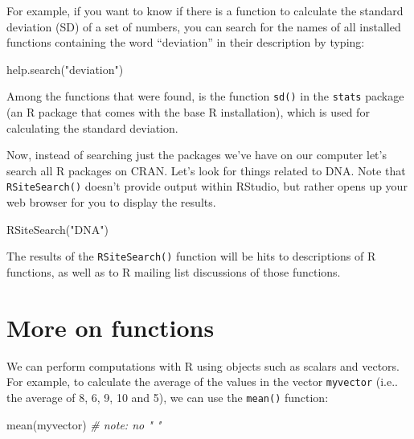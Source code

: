 \documentclass[
]{book}
\newenvironment{Shaded}{\begin{snugshade}}{\end{snugshade}}
\newcommand{\CommentTok}[1]{\textcolor[rgb]{0.56,0.35,0.01}{\textit{#1}}}
\newcommand{\FunctionTok}[1]{\textcolor[rgb]{0.00,0.00,0.00}{#1}}
\newcommand{\NormalTok}[1]{#1}
\newcommand{\StringTok}[1]{\textcolor[rgb]{0.31,0.60,0.02}{#1}}
\begin{document}
For example, if you want to know if there is a function to calculate the standard deviation (SD) of a set of numbers, you can search for the names of all installed functions containing the word ``deviation'' in their description by typing:

\begin{Shaded}
\begin{Highlighting}[]
\FunctionTok{help.search}\NormalTok{(}\StringTok{"deviation"}\NormalTok{)}
\end{Highlighting}
\end{Shaded}

Among the functions that were found, is the function \texttt{sd()} in the \texttt{stats} package (an R package that comes with the base R installation), which is used for calculating the standard deviation.

Now, instead of searching just the packages we've have on our computer let's search all R packages on CRAN. Let's look for things related to DNA. Note that \texttt{RSiteSearch()} doesn't provide output within RStudio, but rather opens up your web browser for you to display the results.

\begin{Shaded}
\begin{Highlighting}[]
\FunctionTok{RSiteSearch}\NormalTok{(}\StringTok{"DNA"}\NormalTok{)}
\end{Highlighting}
\end{Shaded}

The results of the \texttt{RSiteSearch()} function will be hits to descriptions of R functions, as well as to R mailing list discussions of those functions.

\hypertarget{more-on-functions}{%
\section{More on functions}\label{more-on-functions}}

We can perform computations with R using objects such as scalars and vectors. For example, to calculate the average of the values in the vector \texttt{myvector} (i.e.. the average of 8, 6, 9, 10 and 5), we can use the \texttt{mean()} function:

\begin{Shaded}
\begin{Highlighting}[]
\FunctionTok{mean}\NormalTok{(myvector) }\CommentTok{\# note: no " "}
\end{Highlighting}
\end{Shaded}
\end{document}
